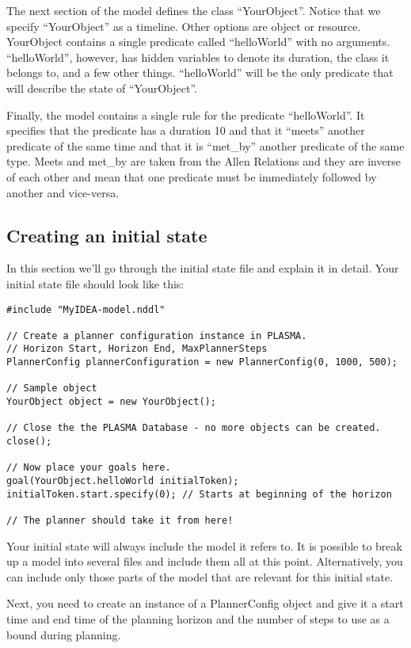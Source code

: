 \documentclass[10pt, letterpaper, twoside]{article}
\begin{document}
{The next section of the model defines the class ``YourObject''.  Notice
that we specify ``YourObject'' as a timeline.  Other options are object or
resource.  YourObject contains a single predicate called ``helloWorld''
with no arguments.  ``helloWorld'', however, has hidden variables to
denote its duration, the class it belongs to, and a few other
things. ``helloWorld'' will be the only predicate that will describe the 
state of ``YourObject''.

Finally, the model contains a single rule for the predicate
``helloWorld''.  It specifies that the predicate has a duration 10 and that
it ``meets'' another predicate of the same time and that it is ``met\_by''
another predicate of the same type.  Meets and met\_by are taken from the
Allen Relations \cite{allen} and they are inverse of each other and mean
that one predicate must be immediately followed by another and vice-versa.

\subsection{Creating an initial state}
In this section we'll go through the initial state file and explain it in
detail. Your initial state file should look like this:

\begin{verbatim}
#include "MyIDEA-model.nddl"

// Create a planner configuration instance in PLASMA.
// Horizon Start, Horizon End, MaxPlannerSteps
PlannerConfig plannerConfiguration = new PlannerConfig(0, 1000, 500);

// Sample object
YourObject object = new YourObject();

// Close the the PLASMA Database - no more objects can be created.
close();

// Now place your goals here.
goal(YourObject.helloWorld initialToken);
initialToken.start.specify(0); // Starts at beginning of the horizon

// The planner should take it from here!
\end{verbatim}

Your initial state will always include the model it refers to.  It is
possible to break up a model into several files and include them all at
this point.  Alternatively, you can include only those parts of the model
that are relevant for this initial state.

Next, you need to create an instance of a PlannerConfig object and give it
a start time and end time of the planning horizon and the number of steps
to use as a bound during planning.  

}
\end{document}

